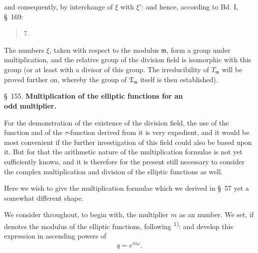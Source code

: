 and consequently, by interchange of $\xi$ with $\xi'$:
and hence, according to Bd. I, \S\ 169:

\begin{quote}
7. 
\end{quote}

The numbers $\xi$, taken with respect to the modulus $\mathfrak{m}$, form a group under multiplication, and the relative group of the division field is isomorphic with this group (or at least with a divisor of this group. The irreducibility of $T_{\mathfrak m}$ will be proved further on, whereby the group of $\mathfrak{T}_{\mathfrak m}$ itself is then established).

\begin{center}
\S\ 155. \textbf{Multiplication of the elliptic functions for an}\\
\textbf{odd multiplier.}
\end{center}

For the demonstration of the existence of the division field, the use of the  function and of the $\tau$-function derived from it is very expedient, and it would be most convenient if the further investigation of this field could also be based upon it. But for that the arithmetic nature of the multiplication formulae is not yet sufficiently known, and it is therefore for the present still necessary to consider the complex multiplication and division of the  elliptic functions as well.

Here we wish to give the multiplication formulae which we derived in \S\ 57 yet a somewhat different shape.

We consider throughout, to begin with, the multiplier $m$ as an  number. We set, if
denotes the modulus of the elliptic functions, following \textsuperscript{1)}\begingroup\renewcommand{\thefootnote}{1)}\endgroup:
and develop this expression in ascending powers of
\[
q = e^{\pi i \omega}.
\]
